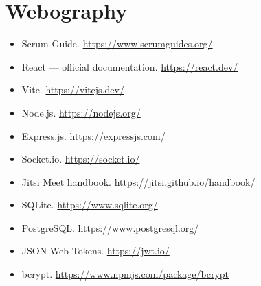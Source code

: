 \documentclass[12pt,a4paper]{report}
\begin{document}
\chapter*{Webography}

\begin{itemize}[leftmargin=*]
    \item Scrum Guide. \url{https://www.scrumguides.org/}
    \item React — official documentation. \url{https://react.dev/}
    \item Vite. \url{https://vitejs.dev/}
    \item Node.js. \url{https://nodejs.org/}
    \item Express.js. \url{https://expressjs.com/}
    \item Socket.io. \url{https://socket.io/}
    \item Jitsi Meet handbook. \url{https://jitsi.github.io/handbook/}
    \item SQLite. \url{https://www.sqlite.org/}
    \item PostgreSQL. \url{https://www.postgresql.org/}
    \item JSON Web Tokens. \url{https://jwt.io/}
    \item bcrypt. \url{https://www.npmjs.com/package/bcrypt}
\end{itemize}
\end{document}
